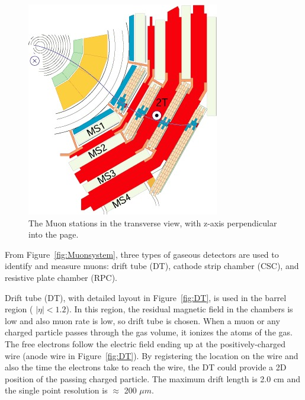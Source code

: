 \begin{figure}
\centering
\includegraphics[width=.9\textwidth]{figures/MuStations.jpg}
\caption{The Muon stations in the transverse view, with z-axis perpendicular into the page.}
\label{fig:MuonStation}
\end{figure}
  

From Figure~\ref{fig:Muonsystem}, three types of gaseous detectors are used to identify and measure muons: drift tube (DT), cathode strip chamber (CSC), and resistive plate chamber (RPC). 

Drift tube (DT), with detailed layout in Figure~\ref{fig:DT}, is used in the barrel region ( $|\eta| < 1.2$).  In this region, the residual magnetic field in the chambers is low and also muon rate is low, so drift tube is chosen. When a muon or any charged particle passes through the gas volume, it ionizes the atoms of the gas. The free electrons follow the electric field ending up at the 
positively-charged wire (anode wire in Figure~\ref{fig:DT}). By registering the location on the wire and also the time the electrons take to reach the wire, the DT could provide a 2D position of the passing charged particle.  
The maximum drift length is 2.0 cm and the single point resolution is $\approx$ 200 $\mu m$.
 
